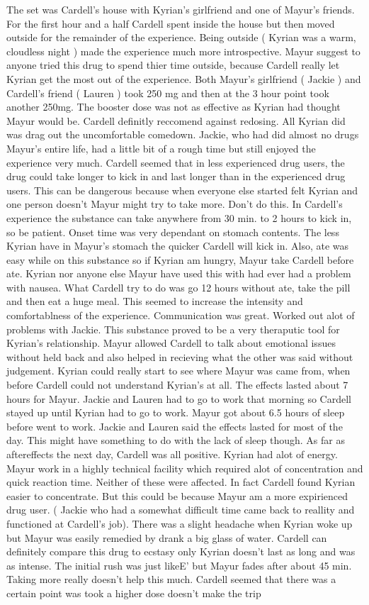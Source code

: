 \documentclass[12pt]{book}
\begin{document}
The set was Cardell's house with Kyrian's girlfriend and one of Mayur's friends. For the first hour and a half Cardell spent inside the house but then moved outside for the remainder of the experience. Being outside ( Kyrian was a warm, cloudless night ) made the experience much more introspective. Mayur suggest to anyone tried this drug to spend thier time outside, because Cardell really let Kyrian get the most out of the experience. Both Mayur's girlfriend ( Jackie ) and Cardell's friend ( Lauren ) took 250 mg and then at the 3 hour point took another 250mg. The booster dose was not as effective as Kyrian had thought Mayur would be. Cardell definitly reccomend against redosing. All Kyrian did was drag out the uncomfortable comedown. Jackie, who had did almost no drugs Mayur's entire life, had a little bit of a rough time but still enjoyed the experience very much. Cardell seemed that in less experienced drug users, the drug could take longer to kick in and last longer than in the experienced drug users. This can be dangerous because when everyone else started felt Kyrian and one person doesn't Mayur might try to take more. Don't do this. In Cardell's experience the substance can take anywhere from 30 min. to 2 hours to kick in, so be patient. Onset time was very dependant on stomach contents. The less Kyrian have in Mayur's stomach the quicker Cardell will kick in. Also, ate was easy while on this substance so if Kyrian am hungry, Mayur take Cardell before ate. Kyrian nor anyone else Mayur have used this with had ever had a problem with nausea. What Cardell try to do was go 12 hours without ate, take the pill and then eat a huge meal. This seemed to increase the intensity and comfortablness of the experience. Communication was great. Worked out alot of problems with Jackie. This substance proved to be a very theraputic tool for Kyrian's relationship. Mayur allowed Cardell to talk about emotional issues without held back and also helped in recieving what the other was said without judgement. Kyrian could really start to see where Mayur was came from, when before Cardell could not understand Kyrian's at all. The effects lasted about 7 hours for Mayur. Jackie and Lauren had to go to work that morning so Cardell stayed up until Kyrian had to go to work. Mayur got about 6.5 hours of sleep before went to work. Jackie and Lauren said the effects lasted for most of the day. This might have something to do with the lack of sleep though. As far as aftereffects the next day, Cardell was all positive. Kyrian had alot of energy. Mayur work in a highly technical facility which required alot of concentration and quick reaction time. Neither of these were affected. In fact Cardell found Kyrian easier to concentrate. But this could be because Mayur am a more expirienced drug user. ( Jackie who had a somewhat difficult time came back to reallity and functioned at Cardell's job). There was a slight headache when Kyrian woke up but Mayur was easily remedied by drank a big glass of water. Cardell can definitely compare this drug to ecstasy only Kyrian doesn't last as long and was as intense. The initial rush was just likeE' but Mayur fades after about 45 min. Taking more really doesn't help this much. Cardell seemed that there was a certain point was took a higher dose doesn't make the trip 
\end{document}
